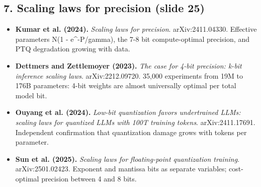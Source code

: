 \documentclass[11pt,letterpaper]{article}
\begin{document}
\subsection*{7. Scaling laws for precision (slide 25)}
\begin{itemize}[leftmargin=1.2em,itemsep=3pt]\sloppy
\item \textbf{Kumar et al. (2024).} \textit{Scaling laws for precision}. arXiv:2411.04330. Effective parameters N(1 - e\^{}{-P/gamma}), the 7-8 bit compute-optimal precision, and PTQ degradation growing with data.
\item \textbf{Dettmers and Zettlemoyer (2023).} \textit{The case for 4-bit precision: k-bit inference scaling laws}. arXiv:2212.09720. 35,000 experiments from 19M to 176B parameters: 4-bit weights are almost universally optimal per total model bit.
\item \textbf{Ouyang et al. (2024).} \textit{Low-bit quantization favors undertrained LLMs: scaling laws for quantized LLMs with 100T training tokens}. arXiv:2411.17691. Independent confirmation that quantization damage grows with tokens per parameter.
\item \textbf{Sun et al. (2025).} \textit{Scaling laws for floating-point quantization training}. arXiv:2501.02423. Exponent and mantissa bits as separate variables; cost-optimal precision between 4 and 8 bits.
\end{itemize}
\end{document}
